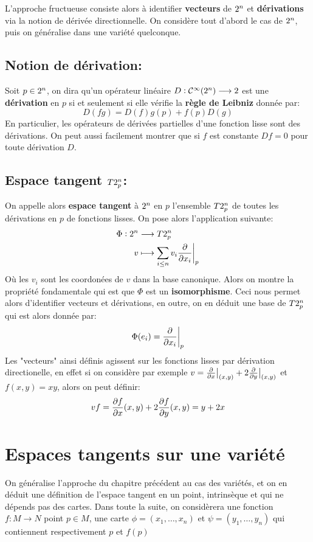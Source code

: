 L'approche fructueuse consiste alors à identifier \textbf{vecteurs} de \( 2^n \) et \textbf{dérivations} via la notion de dérivée directionnelle. On considère tout d'abord le cas de \( 2^n \), puis on généralise dans une variété quelconque.
   \section{Notion de dérivation:}
      Soit \(p \in 2^n\), on dira qu'un opérateur linéaire \( D: \mathcal{C}^\infty(2^n) \longrightarrow 2 \) est une \textbf{dérivation} en \( p \) si et seulement si elle vérifie la \textbf{règle de Leibniz} donnée par:
      \[ 
         D(fg) = D(f)g(p) + f(p)D(g) 
      \]
      En particulier, les opérateurs de dérivées partielles d'une fonction lisse sont des dérivations. On peut aussi facilement montrer que si \( f \) est constante \( Df = 0 \) pour toute dérivation \( D \).
   \section{Espace tangent \( T2^n_p \):}
      On appelle alors \textbf{espace tangent} à \( 2^n \) en \( p \) l'ensemble \( T2^n_p \) de toutes les dérivations en \( p \) de fonctions lisses. On pose alors l'application suivante:
      \[ 
         \begin{aligned}
            \Phi : 2^n &\longrightarrow T2^n_p \\
            v &\longmapsto \sum_{i \leq n} v_i \frac{\partial }{\partial x_i}\biggr|_p
         \end{aligned} 
      \]
      Où les \( v_i \) sont les coordonées de \( v \) dans la base canonique. Alors on montre la propriété fondamentale qui est que \( \Phi \) est un \textbf{isomorphisme}. Ceci nous permet alors d'identifier vecteurs et dérivations, en outre, on en déduit une base de \( T2^n_p \) qui est alors donnée par:
      \[ 
         \Phi(e_i) = \frac{\partial }{\partial x_i}\biggr|_p
      \] 
      Les "vecteurs" ainsi définis agissent sur les fonctions lisses par dérivation directionelle, en effet si on considère par exemple \( v = \frac{\partial }{\partial x}\big|_{(x, y)} + 2\frac{\partial }{\partial y}\big|_{(x, y)}\) et \( f(x, y) = xy \), alors on peut définir:
      \[ 
         vf = \frac{\partial f}{\partial x}(x, y) + 2\frac{\partial f}{\partial y}(x, y) = y + 2x
      \]
\chapter{Espaces tangents sur une variété}
   On généralise l'approche du chapitre précédent au cas des variétés, et on en déduit une définition de l'espace tangent en un point, intrinsèque et qui ne dépends pas des cartes. Dans toute la suite, on considèrera une fonction \( f : M \longrightarrow N \) point \( p \in M \), une carte \( \phi = (x_1, \ldots, x_n) \) et \( \psi = (y_1, \ldots, y_n) \) qui contiennent respectivement \( p \) et \( f(p) \)
